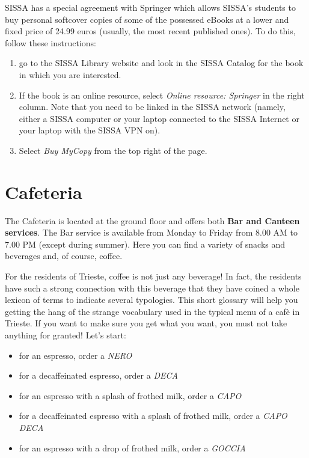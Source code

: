 \documentclass{sissavademecum}
\begin{document}
SISSA has a special agreement with Springer which allows SISSA's students to buy personal softcover copies of some of the possessed eBooks at a lower and fixed price of 24.99 euros (usually, the most recent published ones). To do this, follow these instructions:
\begin{enumerate}
    \item go to the SISSA Library website and look in the SISSA Catalog for the book in which you are interested.
    \item If the book is an online resource, select \emph{Online resource: Springer} in the right column. Note that you need to be linked in the SISSA network (namely, either a SISSA computer or your laptop connected to the SISSA Internet or your laptop with the SISSA VPN on). 
    \item Select \emph{Buy MyCopy} from the top right of the page. 
\end{enumerate}


\section{Cafeteria}

The Cafeteria is located at the ground floor and offers both \textbf{Bar and Canteen services}. The Bar service is available from Monday to Friday from $8.00$ AM to $7.00$ PM (except during summer). Here you can find a variety of snacks and beverages and, of course, coffee. 

For the residents of Trieste, coffee is not just any beverage! In fact, the residents have such a strong connection with this beverage that they have coined a whole lexicon of terms to indicate several typologies. This short glossary will help you getting the hang of the strange vocabulary used in the typical menu of a caf\`e in Trieste. If you want to make sure you get what you want, you must not take anything for granted! Let's start:

\begin{itemize}
    \item for an espresso, order a \textit{NERO}
    \item for a decaffeinated espresso, order a \textit{DECA}
    \item for an espresso with a splash of frothed milk, order a \textit{CAPO}
    \item for a decaffeinated espresso with a splash of frothed milk, order a \textit{CAPO DECA}
    \item for an espresso with a drop of frothed milk, order a \textit{GOCCIA}
\end{itemize}
\end{document}
